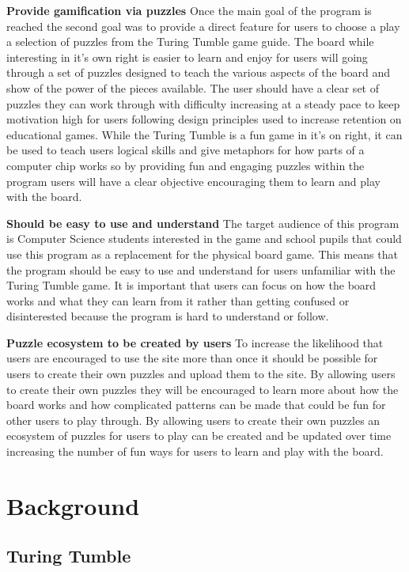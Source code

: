\documentclass{l4proj}
\begin{document}
\textbf{Provide gamification via puzzles} Once the main goal of the program is reached the second goal was to provide a direct feature for users to choose a play a selection of puzzles from the Turing Tumble game guide. The board while interesting in it's own right is easier to learn and enjoy for users will going through a set of puzzles designed to teach the various aspects of the board and show of the power of the pieces available. The user should have a clear set of puzzles they can work through with difficulty increasing at a steady pace to keep motivation high for users following design principles used to increase retention on educational games. While the Turing Tumble is a fun game in it's on right, it can be used to teach users logical skills and give metaphors for how parts of a computer chip works so by providing fun and engaging puzzles within the program users will have a clear objective encouraging them to learn and play with the board.   

\textbf{Should be easy to use and understand} The target audience of this program is Computer Science students interested in the game and school pupils that could use this program as a replacement for the physical board game. This means that the program should be easy to use and understand for users unfamiliar with the Turing Tumble game. It is important that users can focus on how the board works and what they can learn from it rather than getting confused or disinterested because the program is hard to understand or follow. 

\textbf{Puzzle ecosystem to be created by users} To increase the likelihood that users are encouraged to use the site more than once it should be possible for users to create their own puzzles and upload them to the site. By allowing users to create their own puzzles they will be encouraged to learn more about how the board works and how complicated patterns can be made that could be fun for other users to play through. By allowing users to create their own puzzles an ecosystem of puzzles for users to play can be created and be updated over time increasing the number of fun ways for users to learn and play with the board. 

\chapter{Background}
\section{Turing Tumble}
\end{document}
